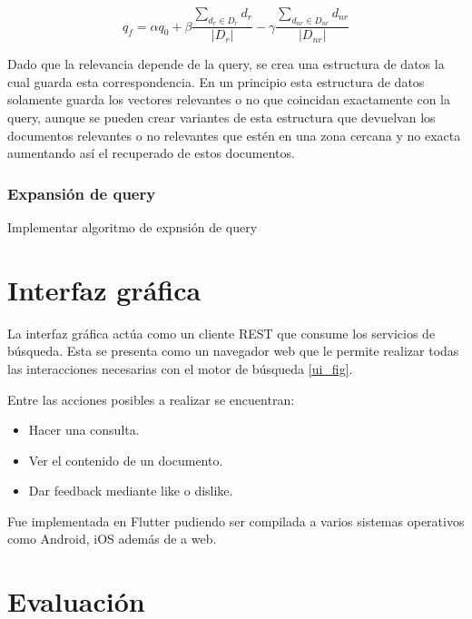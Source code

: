\documentclass[runningheads]{llncs}
\begin{document}
\begin{equation}
    q_f = \alpha q_0 + \beta \frac{\sum_{d_r \in D_r} d_r}{|D_r|} - \gamma \frac{\sum_{d_{nr} \in D_{nr}} d_{nr}}{|D_{nr}|} 
\end{equation}

Dado que la relevancia depende de la query, se crea una estructura de datos la cual guarda esta correspondencia. 
En un principio esta estructura de datos solamente guarda los vectores relevantes o no que coincidan exactamente
con la query, aunque se pueden crear variantes de esta estructura que devuelvan los documentos relevantes o no
relevantes que estén en una zona cercana y no exacta aumentando así el recuperado de estos documentos.

\subsubsection{Expansión de query}

Implementar algoritmo de expnsión de query

\section{Interfaz gráfica}

La interfaz gráfica actúa como un cliente REST que consume los servicios de búsqueda. Esta
se presenta como un navegador web que le permite realizar todas las interacciones necesarias
con el motor de búsqueda \ref{ui_fig}.

Entre las acciones posibles a realizar se encuentran:

\begin{itemize}

\item Hacer una consulta.
\item Ver el contenido de un documento.
\item Dar feedback mediante like o dislike.

\end{itemize}

Fue implementada en Flutter pudiendo ser compilada a varios sistemas operativos como Android,
iOS además de a web.

\section{Evaluación}
\end{document}
